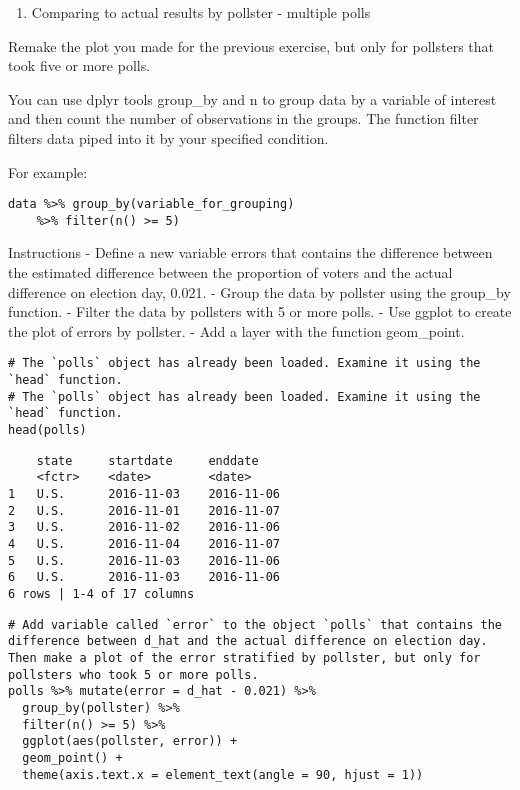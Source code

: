 \documentclass[
]{article}
\providecommand{\tightlist}{%
  \setlength{\itemsep}{0pt}\setlength{\parskip}{0pt}}
\begin{document}
\begin{enumerate}
\def\labelenumi{\arabic{enumi}.}
\setcounter{enumi}{8}
\tightlist
\item
  Comparing to actual results by pollster - multiple polls
\end{enumerate}

Remake the plot you made for the previous exercise, but only for
pollsters that took five or more polls.

You can use dplyr tools group\_by and n to group data by a variable of
interest and then count the number of observations in the groups. The
function filter filters data piped into it by your specified condition.

For example:

\begin{verbatim}
data %>% group_by(variable_for_grouping) 
    %>% filter(n() >= 5)
\end{verbatim}

Instructions - Define a new variable errors that contains the difference
between the estimated difference between the proportion of voters and
the actual difference on election day, 0.021. - Group the data by
pollster using the group\_by function. - Filter the data by pollsters
with 5 or more polls. - Use ggplot to create the plot of errors by
pollster. - Add a layer with the function geom\_point.

\begin{verbatim}
# The `polls` object has already been loaded. Examine it using the `head` function.
# The `polls` object has already been loaded. Examine it using the `head` function.
head(polls)
\end{verbatim}

\begin{verbatim}
    state     startdate     enddate
    <fctr>    <date>        <date>
1   U.S.      2016-11-03    2016-11-06  
2   U.S.      2016-11-01    2016-11-07  
3   U.S.      2016-11-02    2016-11-06  
4   U.S.      2016-11-04    2016-11-07  
5   U.S.      2016-11-03    2016-11-06  
6   U.S.      2016-11-03    2016-11-06  
6 rows | 1-4 of 17 columns
\end{verbatim}

\begin{verbatim}
# Add variable called `error` to the object `polls` that contains the difference between d_hat and the actual difference on election day. Then make a plot of the error stratified by pollster, but only for pollsters who took 5 or more polls.
polls %>% mutate(error = d_hat - 0.021) %>%
  group_by(pollster) %>%
  filter(n() >= 5) %>%
  ggplot(aes(pollster, error)) +
  geom_point() +
  theme(axis.text.x = element_text(angle = 90, hjust = 1))
\end{verbatim}
\end{document}
